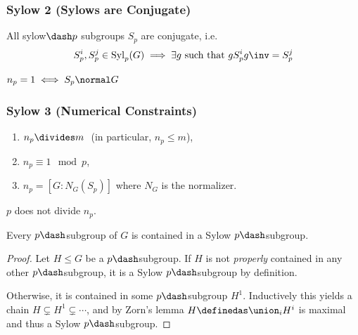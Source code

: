 \hypertarget{sylow-2-sylows-are-conjugate}{%
\subsubsection{Sylow 2 (Sylows are
Conjugate)}\label{sylow-2-sylows-are-conjugate}}

All sylow\(\dash p\) subgroups \(S_p\) are conjugate, i.e.
\begin{align*}
S_p^i, S_p^j \in \mathrm{Syl}_p(G) \implies \exists g \text{ such that } g S_p^i g\inv = S_p^j
\end{align*}

\begin{corollary}

\(n_p = 1 \iff S_p \normal G\)

\end{corollary}

\hypertarget{sylow-3-numerical-constraints}{%
\subsubsection{Sylow 3 (Numerical
Constraints)}\label{sylow-3-numerical-constraints}}

\begin{enumerate}
\def\labelenumi{\arabic{enumi}.}
\item
  \(n_p \divides m~\) (in particular, \(n_p \leq m\)),
\item
  \(n_p \equiv 1 \mod p\),
\item
  \(n_p = [G : N_G(S_p)]\) where \(N_G\) is the normalizer.
\end{enumerate}

\begin{corollary}

\(p\) does not divide \(n_p\).

\end{corollary}

\begin{proposition}

Every \(p\dash\)subgroup of \(G\) is contained in a Sylow
\(p\dash\)subgroup.

\end{proposition}

\begin{proof}

Let \(H \leq G\) be a \(p\dash\)subgroup. If \(H\) is not
\emph{properly} contained in any other \(p\dash\)subgroup, it is a Sylow
\(p\dash\)subgroup by definition.

Otherwise, it is contained in some \(p\dash\)subgroup \(H^1\).
Inductively this yields a chain \(H \subsetneq H^1 \subsetneq \cdots\),
and by Zorn's lemma \(H\definedas \union_i H^i\) is maximal and thus a
Sylow \(p\dash\)subgroup.

\end{proof}

